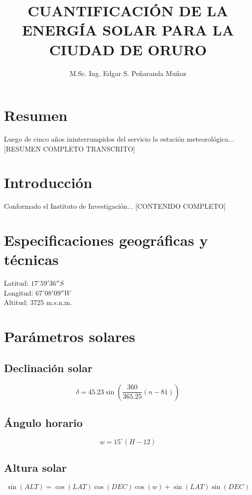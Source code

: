 \documentclass[12pt]{article}
\title{CUANTIFICACIÓN DE LA ENERGÍA SOLAR PARA LA CIUDAD DE ORURO}
\author{M.Sc. Ing. Edgar S. Peñaranda Muñoz}
\date{}
\begin{document}
\maketitle

\section*{Resumen}
Luego de cinco años ininterrumpidos del servicio la estación meteorológica...
[RESUMEN COMPLETO TRANSCRITO]

\section*{Introducción}
Conformado el Instituto de Investigación...
[CONTENIDO COMPLETO]

\section*{Especificaciones geográficas y técnicas}
Latitud: $17^\circ 59' 36'' S$ \\
Longitud: $67^\circ 08' 09'' W$ \\
Altitud: 3725 m.s.n.m.

\section*{Parámetros solares}

\subsection*{Declinación solar}
\begin{equation}
\delta = 45.23 \sin\left(\frac{360}{365.25}(n-81)\right)
\end{equation}

\subsection*{Ángulo horario}
\begin{equation}
w = 15^\circ (H - 12)
\end{equation}

\subsection*{Altura solar}
\begin{equation}
\sin(ALT) = \cos(LAT)\cos(DEC)\cos(w) + \sin(LAT)\sin(DEC)
\end{equation}
\end{document}
